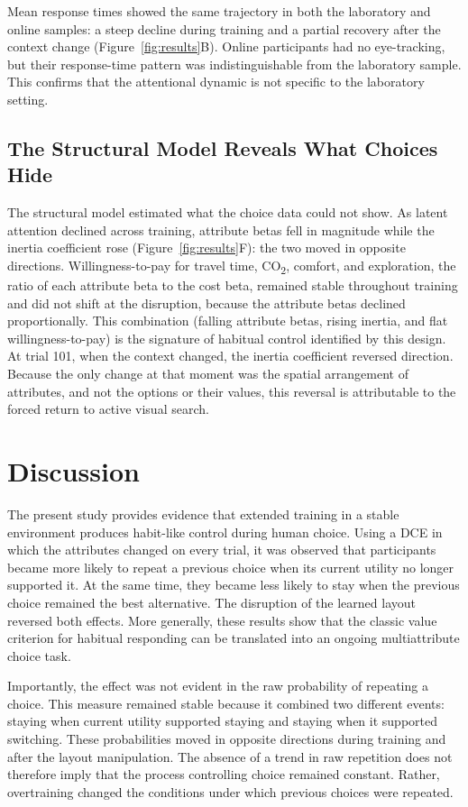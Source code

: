 \documentclass[man,natbib,floatsintext]{apa7}
\begin{document}
Mean response times showed the same trajectory in both the laboratory and online samples: a steep decline during training and a partial recovery after the context change (Figure~\ref{fig:results}B). Online participants had no eye-tracking, but their response-time pattern was indistinguishable from the laboratory sample. This confirms that the attentional dynamic is not specific to the laboratory setting.

\subsection{The Structural Model Reveals What Choices Hide}

The structural model estimated what the choice data could not show. As latent attention declined across training, attribute betas fell in magnitude while the inertia coefficient rose (Figure~\ref{fig:results}F): the two moved in opposite directions. Willingness-to-pay for travel time, CO\textsubscript{2}, comfort, and exploration, the ratio of each attribute beta to the cost beta, remained stable throughout training and did not shift at the disruption, because the attribute betas declined proportionally. This combination (falling attribute betas, rising inertia, and flat willingness-to-pay) is the signature of habitual control identified by this design. At trial 101, when the context changed, the inertia coefficient reversed direction. Because the only change at that moment was the spatial arrangement of attributes, and not the options or their values, this reversal is attributable to the forced return to active visual search.

\section{Discussion}

The present study provides evidence that extended training in a stable environment produces habit-like control during human choice. Using a DCE in which the attributes changed on every trial, it was observed that participants became more likely to repeat a previous choice when its current utility no longer supported it. At the same time, they became less likely to stay when the previous choice remained the best alternative. The disruption of the learned layout reversed both effects. More generally, these results show that the classic value criterion for habitual responding can be translated into an ongoing multiattribute choice task.

Importantly, the effect was not evident in the raw probability of repeating a choice. This measure remained stable because it combined two different events: staying when current utility supported staying and staying when it supported switching. These probabilities moved in opposite directions during training and after the layout manipulation. The absence of a trend in raw repetition does not therefore imply that the process controlling choice remained constant. Rather, overtraining changed the conditions under which previous choices were repeated.
\end{document}
